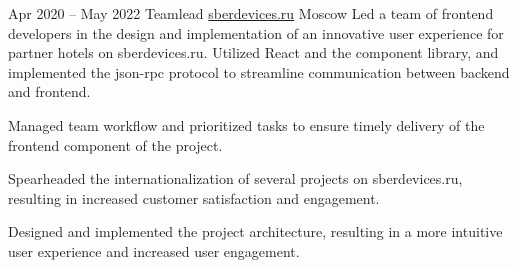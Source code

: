 \cventry
  {Apr 2020 – May 2022}
  {Teamlead}
  {\href{https://sberdevices.ru}{sberdevices.ru}}
  {Moscow}
  {}
  {Led a team of frontend developers in the design and implementation of an innovative user experience for partner hotels on sberdevices.ru. Utilized React and the component library, and implemented the json-rpc protocol to streamline communication between backend and frontend.}

\cvlistitem
  {Managed team workflow and prioritized tasks to ensure timely delivery of the frontend component of the project.}

\cvlistitem
  {Spearheaded the internationalization of several projects on sberdevices.ru, resulting in increased customer satisfaction and engagement.}

\cvlistitem
  {Designed and implemented the project architecture, resulting in a more intuitive user experience and increased user engagement.}
